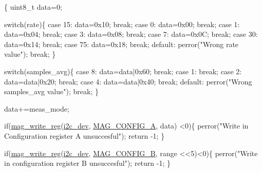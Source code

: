 \begin{DoxyCode}
\{ 
  uint8\_t data=0;

  \textcolor{keywordflow}{switch}(rate)\{
    \textcolor{keywordflow}{case} 15:
      data=0x10;
      \textcolor{keywordflow}{break};
    \textcolor{keywordflow}{case} 0:
      data=0x00;
      \textcolor{keywordflow}{break};
    \textcolor{keywordflow}{case} 1:
      data=0x04;
      \textcolor{keywordflow}{break};
    \textcolor{keywordflow}{case} 3:
      data=0x08;
      \textcolor{keywordflow}{break};
    \textcolor{keywordflow}{case} 7:
      data=0x0C;
      \textcolor{keywordflow}{break};
    \textcolor{keywordflow}{case} 30:
      data=0x14;
      \textcolor{keywordflow}{break};
    \textcolor{keywordflow}{case} 75:
      data=0x18;
      \textcolor{keywordflow}{break};
    \textcolor{keywordflow}{default}:
      perror(\textcolor{stringliteral}{"Wrong rate value"});
      \textcolor{keywordflow}{break};
  \}
  
  \textcolor{keywordflow}{switch}(samples\_avg)\{
    \textcolor{keywordflow}{case} 8:
      data=data|0x60;
      \textcolor{keywordflow}{break};
    \textcolor{keywordflow}{case} 1:
      \textcolor{keywordflow}{break};
    \textcolor{keywordflow}{case} 2:
      data=data|0x20;
      \textcolor{keywordflow}{break};
    \textcolor{keywordflow}{case} 4:
      data=data|0x40;
      \textcolor{keywordflow}{break};
    \textcolor{keywordflow}{default}:
      perror(\textcolor{stringliteral}{"Wrong samples\_avg value"});
      \textcolor{keywordflow}{break};
  \}
  
  data+=meas\_mode;
  
  \textcolor{keywordflow}{if}(\hyperlink{imu__functions_01_07C_xC3_xB3pia_01em_01conflito_01de_01Andr_xC3_xA9_01Carvalho_012013-04-26_08_8h_ab5d0ae421cd4bb10b1b7a1eda167416b}{mag\_write\_reg}(\hyperlink{CommunicationV0_2communication_8c_a7751bd45ac1064efb35adf1f19c25db8}{i2c\_dev}, \hyperlink{communication_2imu__regs_8h_a4c80cd6ce866f16a3d999ee2c5635ec9}{MAG\_CONFIG\_A}, data)
      <0)\{
    perror(\textcolor{stringliteral}{"Write in Configuration register A unsuccesful"});
    \textcolor{keywordflow}{return} -1;
  \}
  
  \textcolor{keywordflow}{if}(\hyperlink{imu__functions_01_07C_xC3_xB3pia_01em_01conflito_01de_01Andr_xC3_xA9_01Carvalho_012013-04-26_08_8h_ab5d0ae421cd4bb10b1b7a1eda167416b}{mag\_write\_reg}(\hyperlink{CommunicationV0_2communication_8c_a7751bd45ac1064efb35adf1f19c25db8}{i2c\_dev}, \hyperlink{communication_2imu__regs_8h_a094173f77219df894d97eed44405d942}{MAG\_CONFIG\_B}, range
      <<5)<0)\{
    perror(\textcolor{stringliteral}{"Write in configuration register B unsuccesful"});
    \textcolor{keywordflow}{return} -1;
  \}
  

\end{DoxyCode}
